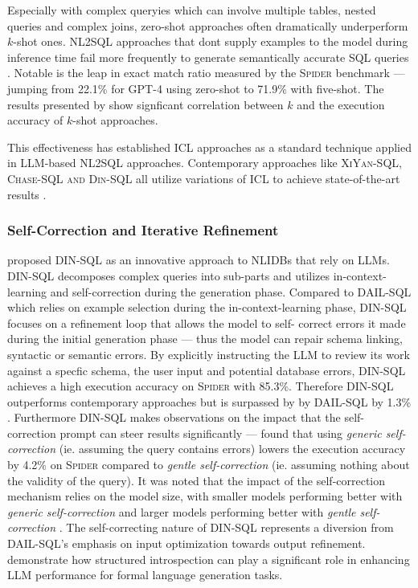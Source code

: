 \documentclass{article}
\begin{document}
Especially with complex queryies which can involve multiple tables, nested queries and complex joins, zero-shot approaches
often dramatically underperform $k$-shot ones. NL2SQL approaches that dont supply examples to the model during inference time
fail more frequently to generate semantically accurate SQL queries \citep{DAIL-SQL}. Notable is the leap in exact match ratio
measured by the \textsc{Spider} benchmark — jumping from 22.1\% for GPT-4 using zero-shot to 71.9\% with five-shot. The
results presented by \cite{DAIL-SQL} show signficant correlation between $k$ and the execution accuracy of $k$-shot approaches.

This effectiveness has established ICL approaches as a standard technique applied in LLM-based NL2SQL approaches. Contemporary
approaches like \textsc{XiYan-SQL, Chase-SQL and Din-SQL} all utilize variations of ICL to achieve state-of-the-art results
\citep{XiYan, CHASE, DINSQL}.

\subsubsection{Self-Correction and Iterative Refinement}

\cite{DINSQL} proposed DIN-SQL as an innovative approach to NLIDBs that rely on LLMs. DIN-SQL decomposes complex queries into
sub-parts and utilizes in-context-learning and self-correction during the generation phase. Compared to DAIL-SQL which relies
on example selection during the in-context-learning phase, DIN-SQL focuses on a refinement loop that allows the model to self-
correct errors it made during the initial generation phase — thus the model can repair schema linking, syntactic or semantic
errors. By explicitly instructing the LLM to review its work against a specfic schema, the user input and potential database
errors, DIN-SQL achieves a high execution accuracy on \textsc{Spider} with 85.3\%. Therefore DIN-SQL outperforms contemporary
approaches but is surpassed by by DAIL-SQL by 1.3\% \citep{DINSQL, DAIL-SQL}. Furthermore DIN-SQL makes observations on the
impact that the self-correction prompt can steer results significantly — \citeauthor{DINSQL} found that using \textit{generic
self-correction} (ie. assuming the query contains errors) lowers the execution accuracy by 4.2\% on \textsc{Spider} compared to
\textit{gentle self-correction} (ie. assuming nothing about the validity of the query). It was noted that the impact of the
self-correction mechanism relies on the model size, with smaller models performing better with \textit{generic self-correction}
and larger models performing better with \textit{gentle self-correction} \citep{DINSQL}. The self-correcting nature of DIN-SQL
represents a diversion from DAIL-SQL's emphasis on input optimization towards output refinement. \citeauthor{DINSQL} demonstrate
how structured introspection can play a significant role in enhancing LLM performance for formal language generation tasks.
\end{document}
